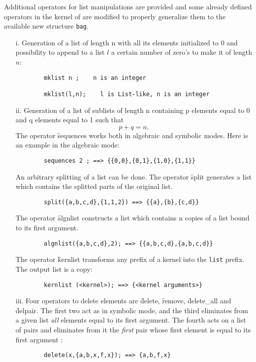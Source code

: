 \hypertarget{operator:MKLIST}{}
\hypertarget{operator:SEQUENCES}{}
\hypertarget{operator:SPLIT}{}
\hypertarget{operator:ALGNLIST}{}
\hypertarget{operator:KERNLIST}{}
Additional operators for list manipulations are provided and some already
defined operators in the kernel of \REDUCE are modified to properly
generalize them to the available new structure \texttt{bag}.
\begin{itemize}
\item[i.]
Generation of a list of length n with all its elements initialized to 0
and possibility to append to a list $l$ a certain number of
zero's to make it of length $n$:
\begin{verbatim}
        mklist n ;    n is an integer

        mklist(l,n);    l is List-like, n is an integer
\end{verbatim}

\item[ii.]
Generation of a list of sublists of length n containing p elements
equal to 0 and q elements equal to 1 such that  \[p+q=n .\]
The operator \f{sequences} works both in algebraic and
symbolic modes.  Here is an example in the algebraic mode:
\begin{verbatim}
        sequences 2 ; ==> {{0,0},{0,1},{1,0},{1,1}}
\end{verbatim}
An arbitrary splitting of a list can be done. The operator \f{split} 
generates a list which contains the splitted parts of the original list.
\begin{verbatim}
        split({a,b,c,d},{1,1,2}) ==> {{a},{b},{c,d}}
\end{verbatim}
The operator \f{algnlist} constructs a list which contains n copies  
of a list bound to its first argument.
\begin{verbatim}
        algnlist({a,b,c,d},2); ==> {{a,b,c,d},{a,b,c,d}}
\end{verbatim}
The operator \f{kernlist} transforms any prefix of a kernel into the
\texttt{list} prefix. The output list is a copy:
\begin{verbatim}
        kernlist (<kernel>); ==> {<kernel arguments>}
\end{verbatim}
\item[iii.]
\hypertarget{operator:DELETE}{}
\hypertarget{operator:DELETE_ALL}{}
\hypertarget{operator:DELPAIR}{}
\hypertarget{operator:REMOVE}{}
Four operators to delete elements are \f{delete}, \f{remove}, \f{delete\_all} and
\f{delpair}. The first two act as in symbolic mode, and the third
eliminates from a given list \emph{all}
elements equal to its first argument. The fourth acts on a list of pairs
and eliminates from it the \emph{first} pair whose first element is equal to
its first argument :
\begin{verbatim}
        delete(x,{a,b,x,f,x}); ==> {a,b,f,x}


\end{verbatim}
\end{itemize}
